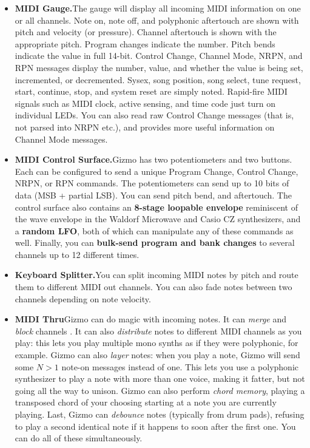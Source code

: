 \documentclass{article}
\begin{document}
\begin{itemize}
\item {\bf MIDI Gauge.}\quad The gauge will display all incoming MIDI information on one or all channels.  Note on, note off, and polyphonic aftertouch are shown with pitch and velocity (or pressure).  Channel aftertouch is shown with the appropriate pitch.  Program changes indicate the number.  Pitch bends indicate the value in full 14-bit.  Control Change, Channel Mode, NRPN, and RPN messages display the number, value, and whether the value is being set, incremented, or decremented.  Sysex, song position, song select, tune request, start, continue, stop, and system reset are simply noted.  Rapid-fire MIDI signals such as MIDI clock, active sensing, and time code just turn on individual LEDs. You can also read raw Control Change messages (that is, not parsed into NRPN etc.), and provides more useful information on Channel Mode messages.

\item {\bf MIDI Control Surface.}\quad Gizmo has two potentiometers and two buttons.  Each can be configured to send a unique Program Change, Control Change, NRPN, or RPN commands.  The potentiometers can send up to 10 bits of data (MSB + partial LSB).   You can send pitch bend, and aftertouch.  The control surface also contains an {\bf 8-stage loopable envelope} reminiscent of the wave envelope in the Waldorf Microwave and Casio CZ synthesizers, and a {\bf random LFO}, both of which can manipulate any of these commands as well.  Finally, you can {\bf bulk-send program and bank changes} to several channels up to 12 different times.

\item {\bf  Keyboard Splitter.}\quad You can split incoming MIDI notes by pitch and route them to different MIDI out channels.  You can also fade notes between two channels depending on note velocity.

\item {\bf  MIDI Thru}\quad Gizmo can do magic with incoming notes.  It can {\it merge} and {\it block} channels%
.  It can also {\it distribute} notes to different MIDI channels as you play: this lets you play multiple mono synths as if they were polyphonic, for example.  Gizmo can also {\it layer} notes: when you play a note, Gizmo will send some \(N>1\) note-on messages instead of one.  This lets you use a polyphonic synthesizer to play a note with more than one voice, making it fatter, but not going all the way to unison.  Gizmo can also perform {\it chord memory}, playing a transposed chord of your choosing starting at a note you are currently playing.  Last, Gizmo can {\it debounce} notes (typically from drum pads), refusing to play a second identical note if it happens to soon after the first one.  You can do all of these simultaneously.


\end{itemize}
\end{document}
